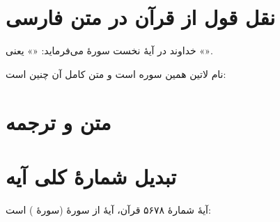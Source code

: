\documentclass{article}
\begin{document}
\section*{نقل قول از قرآن در متن فارسی}

خداوند در آیهٔ نخست سورهٔ \surahname*[112] می‌فرماید:
«\quranayah*[112][1]» یعنی «\quranayahfa*[112][1]».

\medskip
نام لاتین همین سوره \lr{\surahname[112]} است و متن کامل آن چنین است:

\begin{center}
  \quransurah[112]
\end{center}

\section*{متن و ترجمه}
\quranayah[2][255]

\smallskip
{\small\quranayahfa[2][255]}

\section*{تبدیل شمارهٔ کلی آیه}
آیهٔ شمارهٔ ۵۶۷۸ قرآن، آیهٔ \the\ayahcount{} از سورهٔ
\surahname*[\the\surahcount] (سورهٔ \the\surahcount) است:

\quranayah[\the\surahcount][\the\ayahcount]
\end{document}
